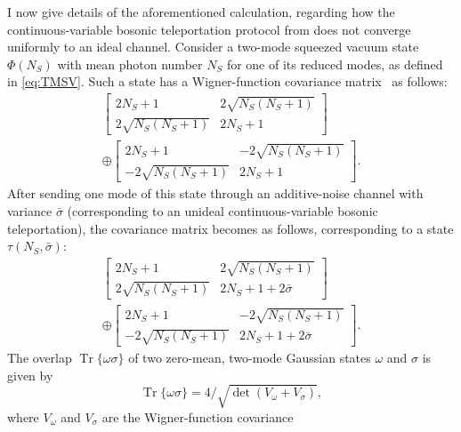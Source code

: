 \documentclass[apsrev,twocolumn]{revtex4-1}%
\begin{document}
I now give details of the aforementioned calculation, regarding how the
continuous-variable bosonic teleportation protocol from
\cite{prl1998braunstein} does not converge uniformly to an ideal channel.
Consider a two-mode squeezed vacuum state $\Phi(N_{S})$ with mean photon
number $N_{S}$ for one of its reduced modes, as defined in \eqref{eq:TMSV}.
Such a state has a Wigner-function covariance matrix \cite{S17}\ as follows:%
\begin{multline}%
\begin{bmatrix}
2N_{S}+1 & 2\sqrt{N_{S}(N_{S}+1)}\\
2\sqrt{N_{S}(N_{S}+1)} & 2N_{S}+1
\end{bmatrix}
\\
\oplus%
\begin{bmatrix}
2N_{S}+1 & -2\sqrt{N_{S}(N_{S}+1)}\\
-2\sqrt{N_{S}(N_{S}+1)} & 2N_{S}+1
\end{bmatrix}
.
\end{multline}
After sending one mode of this state through an additive-noise channel with
variance $\bar{\sigma}$ (corresponding to an unideal continuous-variable
bosonic teleportation), the covariance matrix becomes as follows,
corresponding to a state $\tau(N_{S},\bar{\sigma})$:%
\begin{multline}%
\begin{bmatrix}
2N_{S}+1 & 2\sqrt{N_{S}(N_{S}+1)}\\
2\sqrt{N_{S}(N_{S}+1)} & 2N_{S}+1+2 \bar{\sigma}%
\end{bmatrix}
\\
\oplus%
\begin{bmatrix}
2N_{S}+1 & -2\sqrt{N_{S}(N_{S}+1)}\\
-2\sqrt{N_{S}(N_{S}+1)} & 2N_{S}+1+2 \bar{\sigma}%
\end{bmatrix}
.
\end{multline}
The overlap $\operatorname{Tr}\{\omega\sigma\}$ of two zero-mean, two-mode
Gaussian states $\omega$ and $\sigma$ is given by \cite[Eq.~(4.51)]{S17}%
\begin{equation}
\operatorname{Tr}\{\omega\sigma\}=4/\sqrt{\det(V_{\omega}+V_{\sigma})},
\end{equation}
where $V_{\omega}$ and $V_{\sigma}$ are the Wigner-function covariance
\end{document}
